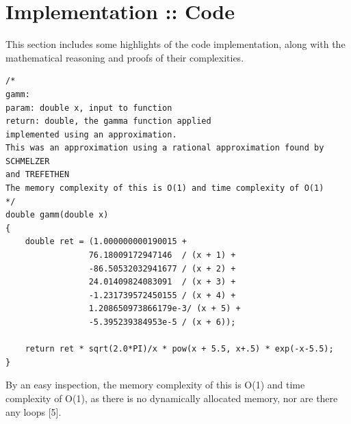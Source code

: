 \documentclass[12pt]{article}
\begin{document}
\section{Implementation :: Code}
This section includes some highlights of the code implementation, along with the mathematical reasoning and proofs of their complexities.
\lstset { 
    language=C++,
    basicstyle=\footnotesize,
}
\begin{lstlisting}
/*
gamm:
param: double x, input to function
return: double, the gamma function applied
implemented using an approximation.
This was an approximation using a rational approximation found by SCHMELZER
and TREFETHEN
The memory complexity of this is O(1) and time complexity of O(1)
*/
double gamm(double x) 
{
    double ret = (1.000000000190015 + 
                 76.18009172947146  / (x + 1) +  
                 -86.50532032941677 / (x + 2) + 
                 24.01409824083091  / (x + 3) +  
                 -1.231739572450155 / (x + 4) + 
                 1.208650973866179e-3/ (x + 5) + 
                 -5.395239384953e-5 / (x + 6));
    
    return ret * sqrt(2.0*PI)/x * pow(x + 5.5, x+.5) * exp(-x-5.5);
}
\end{lstlisting}
By an easy inspection, the memory complexity of this is O(1) and time complexity of O(1), as there is no dynamically allocated memory, nor are there any loops [5].
\end{document}
